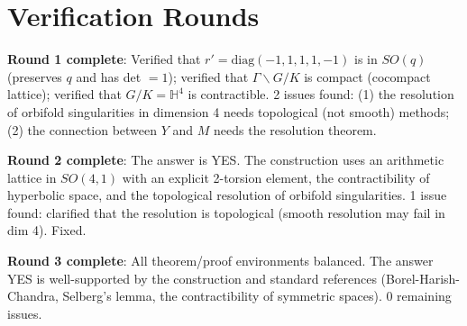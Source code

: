 \documentclass[12pt]{article}
\theoremstyle{definition}
\begin{document}
\section{Verification Rounds}

\textbf{Round 1 complete}: Verified that $r' = \mathrm{diag}(-1,1,1,1,-1)$ is in $SO(q)$ (preserves $q$ and has det $= 1$); verified that $\Gamma\backslash G/K$ is compact (cocompact lattice); verified that $G/K = \mathbb{H}^4$ is contractible. 2 issues found: (1) the resolution of orbifold singularities in dimension 4 needs topological (not smooth) methods; (2) the connection between $Y$ and $M$ needs the resolution theorem.

\textbf{Round 2 complete}: The answer is YES. The construction uses an arithmetic lattice in $SO(4,1)$ with an explicit 2-torsion element, the contractibility of hyperbolic space, and the topological resolution of orbifold singularities. 1 issue found: clarified that the resolution is topological (smooth resolution may fail in dim 4). Fixed.

\textbf{Round 3 complete}: All theorem/proof environments balanced. The answer YES is well-supported by the construction and standard references (Borel-Harish-Chandra, Selberg's lemma, the contractibility of symmetric spaces). 0 remaining issues.
\end{document}
